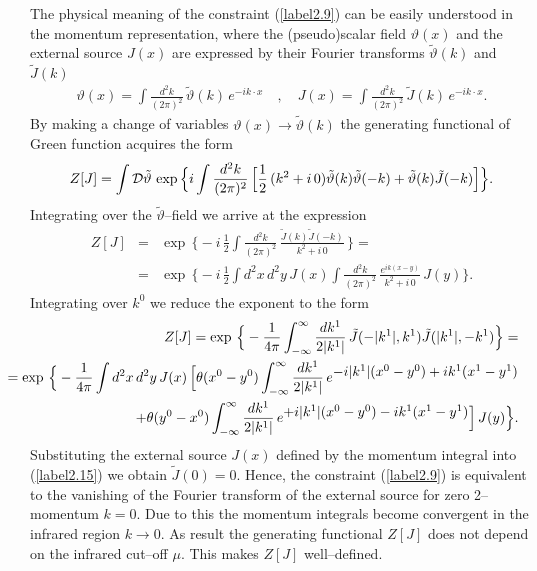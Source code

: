 \documentclass[a4paper,12pt] {article}
\begin{document}
The physical meaning of the constraint (\ref{label2.9}) can be easily
understood in the momentum representation, where the (pseudo)scalar
field $\vartheta(x)$ and the external source $J(x)$ are expressed by
their Fourier transforms $\tilde{\vartheta}(k)$ and $\tilde{J}(k)$
%
\begin{eqnarray}\label{label2.15}
\vartheta(x) = \int
\frac{d^2k}{(2\pi)^2}\,\tilde{\vartheta}(k)\,e^{\textstyle -ik\cdot
x}\quad,\quad J(x) = \int
\frac{d^2k}{(2\pi)^2}\,\tilde{J}(k)\,e^{\textstyle -ik\cdot x}.
\end{eqnarray}
%
By making a change of variables $\vartheta(x) \to
\tilde{\vartheta}(k)$ the generating functional of Green function
acquires the form
%
\begin{eqnarray}\label{label2.16}
Z[J] = \int {\cal D}\tilde{\vartheta}\,
\exp\Big\{i\int\frac{d^2k}{(2\pi)^2}\,\Big[\frac{1}{2}\,(k^2+i\,0)
\tilde{\vartheta}(k) \tilde{\vartheta}(-k) +
\tilde{\vartheta}(k)\tilde{J}(-k)\Big]\Big\}.
\end{eqnarray}
%
Integrating over the $\tilde{\vartheta}$--field we arrive at the
expression
%
\begin{eqnarray}\label{label2.17}
Z[J] &=& \exp\,\Big\{- i\,\frac{1}{2}\int
\frac{d^2k}{(2\pi)^2}\,\frac{\tilde{J}(k)\tilde{J}(-k)}{k^2 +
i\,0}\,\Big\} = \nonumber\\ &=& \exp\,\Big\{- i\,\frac{1}{2}\int
d^2x\,d^2y\,J(x)\int \frac{d^2k}{(2\pi)^2}\,\frac{e^{\textstyle
ik(x-y)}}{k^2 + i\,0}\,J(y)\Big\}.
\end{eqnarray}
%
Integrating over $k^0$ we reduce the exponent to the form
%
\begin{eqnarray}\label{label2.18}
\hspace{-0.5in}&&Z[J] =\exp\,\Big\{-
\frac{1}{4\pi}\int^{\infty}_{-\infty}
\frac{dk^1}{2|k^1|}\,\tilde{J}(-|k^1|,k^1)\tilde{J}(|k^1|,-k^1)\Big\}=
\nonumber\\
\hspace{-0.5in}&&=\exp\,\Big\{- \frac{1}{4\pi}\int
d^2x\,d^2y\,J(x)\,\Big[\theta(x^0 - y^0)\int^{\infty}_{-\infty}
\frac{dk^1}{2|k^1|}\,e^{\textstyle -i|k^1|(x^0 - y^0) + ik^1(x^1 -
y^1)}\nonumber\\
\hspace{-0.5in}&& + \theta(y^0 - x^0)\int^{\infty}_{-\infty}
\frac{dk^1}{2|k^1|}\,e^{\textstyle +i|k^1|(x^0 - y^0) - ik^1(x^1 -
y^1)}\Big]\,J(y)\Big\}.
\end{eqnarray}
%
Substituting the external source $J(x)$ defined by the momentum
integral into (\ref{label2.15}) we obtain $\tilde{J}(0) = 0$. Hence,
the constraint (\ref{label2.9}) is equivalent to the vanishing of the
Fourier transform of the external source for zero 2--momentum $k = 0$.
Due to this the momentum integrals become convergent in the infrared
region $k \to 0$. As result the generating functional $Z[J]$ does not
depend on the infrared cut--off $\mu$. This makes $Z[J]$
well--defined.
\end{document}
